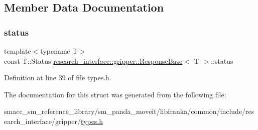 \subsection{Member Data Documentation}
\mbox{\label{structresearch__interface_1_1gripper_1_1ResponseBase_a4d4d13a790eac0381966f39dbcdff84a}} 
\subsubsection{\texorpdfstring{status}{status}}
{\footnotesize\ttfamily template$<$typename T$>$ \\
const T\+::\+Status \hyperlink{structresearch__interface_1_1gripper_1_1ResponseBase}{research\+\_\+interface\+::gripper\+::\+Response\+Base}$<$ T $>$\+::status}



Definition at line 39 of file types.\+h.



The documentation for this struct was generated from the following file\+:\begin{DoxyCompactItemize}
\item 
smacc\+\_\+sm\+\_\+reference\+\_\+library/sm\+\_\+panda\+\_\+moveit/libfranka/common/include/research\+\_\+interface/gripper/\hyperlink{types_8h}{types.\+h}\end{DoxyCompactItemize}
